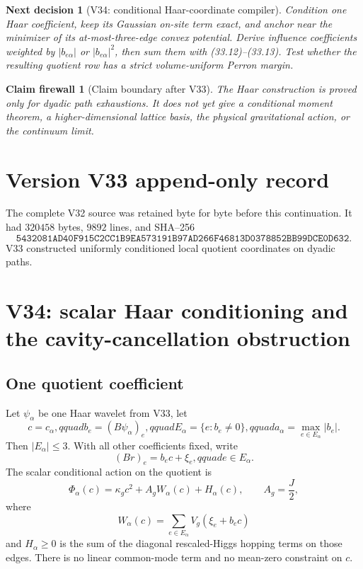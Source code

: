 \documentclass[11pt]{article}
\newtheorem{firewall}[theorem]{Claim firewall}
\newtheorem{decision}[theorem]{Next decision}
\theoremstyle{remark}
\begin{document}
\begin{decision}[V34: conditional Haar-coordinate compiler]
\label{dec:v17v33-next}
Condition one Haar coefficient, keep its Gaussian on-site term exact,
and anchor near the minimizer of its at-most-three-edge convex
potential.  Derive influence coefficients weighted by
\(|b_{e\alpha}|\) or \(|b_{e\alpha}|^2\), then sum them with
(33.12)--(33.13).  Test whether the resulting quotient row has a strict
volume-uniform Perron margin.
\end{decision}

\begin{firewall}[Claim boundary after V33]
\label{fire:v17v33}
The Haar construction is proved only for dyadic path exhaustions.  It
does not yet give a conditional moment theorem, a higher-dimensional
lattice basis, the physical gravitational action, or the continuum
limit.
\end{firewall}

\section*{Version V33 append-only record}
The complete V32 source was retained byte for byte before this
continuation.  It had \(320458\) bytes, \(9892\) lines, and SHA--256
\[
 \texttt{5432081AD40F915C2CC1B9EA573191B97AD266F46813D0378852BB99DCE0D632}.
\]
V33 constructed uniformly conditioned local quotient coordinates on
dyadic paths.


\section{V34: scalar Haar conditioning and the cavity-cancellation obstruction}
\label{sec:v17v34}

\subsection{One quotient coefficient}

Let \(\psi_\alpha\) be one Haar wavelet from V33, let
\[
 c=c_\alpha,qquad
 b_e=(B\psi_\alpha)_e,qquad
 E_\alpha=\{e:b_e\ne0\},qquad
 a_\alpha=\max_{e\in E_\alpha}|b_e|.              \tag{34.1}
\]
Then \(|E_\alpha|\leq3\).  With all other coefficients fixed, write
\[
 (Br)_e=b_ec+\xi_e,qquad e\in E_\alpha.           \tag{34.2}
\]
The scalar conditional action on the quotient is
\[
 \Phi_\alpha(c)
 =\kappa_gc^2+A_gW_\alpha(c)+H_\alpha(c),
 \qquad A_g=\frac J2,                              \tag{34.3}
\]
where
\[
 W_\alpha(c)=\sum_{e\in E_\alpha}V_g(\xi_e+b_ec)  \tag{34.4}
\]
and \(H_\alpha\geq0\) is the sum of the diagonal rescaled-Higgs
hopping terms on those edges.  There is no linear common-mode term and
no mean-zero constraint on \(c\).
\end{document}
